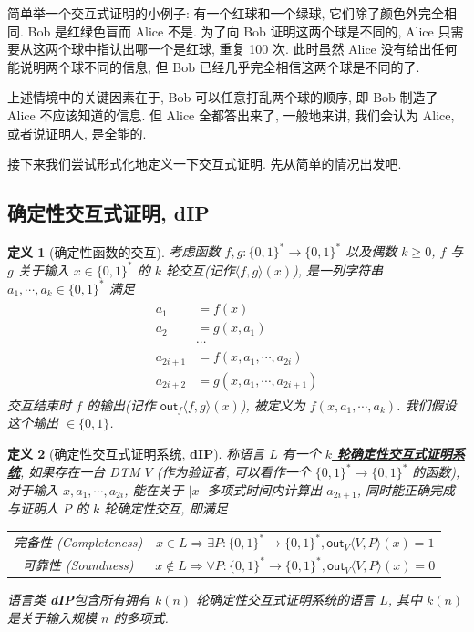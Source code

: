 \documentclass[8pt]{article}
\theoremstyle{compact}
\newtheorem{definition}{定义}[section]
\def\obj#1{\textbf{\uline{#1}}}
\def\ge{\geqslant}
\begin{document}
简单举一个交互式证明的小例子: 有一个红球和一个绿球, 它们除了颜色外完全相同. Bob 是红绿色盲而 Alice 不是. 为了向 Bob 证明这两个球是不同的, Alice 只需要从这两个球中指认出哪一个是红球, 重复 100 次. 此时虽然 Alice 没有给出任何能说明两个球不同的信息, 但 Bob 已经几乎完全相信这两个球是不同的了.

上述情境中的关键因素在于, Bob 可以任意打乱两个球的顺序, 即 Bob 制造了 Alice 不应该知道的信息. 但 Alice 全都答出来了, 一般地来讲, 我们会认为 Alice, 或者说证明人, 是全能的.

接下来我们尝试形式化地定义一下交互式证明. 先从简单的情况出发吧.

\def\dIP{\textbf{dIP}}
\subsection{确定性交互式证明, \dIP}
\begin{definition}[确定性函数的交互]
	考虑函数 $f, g: \{0, 1\}^* \to \{0, 1\}^*$ 以及偶数 $k \ge 0$, $f$ 与 $g$ 关于输入 $x \in \{0, 1\}^*$ 的 $k$ 轮交互(记作$\langle f, g\rangle(x)$), 是一列字符串 $a_1, \cdots, a_k \in \{0, 1\}^*$ 满足 \begin{align*}
		\begin{split}
			a_1 &= f(x) \\
			a_2 &= g(x, a_1) \\ 
			&\cdots \\
			a_{2i+1} &= f(x, a_1, \cdots, a_{2i}) \\
			a_{2i+2} &= g(x, a_1, \cdots, a_{2i+1})			
		\end{split}
	\end{align*}
	交互结束时 $f$ 的输出(记作 $\textsf{out}_f\langle f, g \rangle (x)$), 被定义为 $f(x, a_1, \cdots, a_k)$. 我们假设这个输出 $\in \{0, 1\}$.
	\label{deterministic_interaction}
\end{definition}
\begin{definition}[确定性交互式证明系统, \dIP]
	称语言 $L$ 有一个 \obj{$k$ 轮确定性交互式证明系统}, 如果存在一台 DTM $V$ (作为验证者, 可以看作一个 $\{0, 1\}^* \to \{0, 1\}^*$ 的函数), 对于输入 $x, a_1, \cdots, a_{2i}$, 能在关于 $|x|$ 多项式时间内计算出 $a_{2i+1}$, 同时能正确完成与证明人 $P$ 的 $k$ 轮确定性交互, 即满足 \begin{center}
		\begin{tabular}{cc}
			完备性 (Completeness) & $x \in L \Rightarrow \exists P: \{0, 1\}^* \to \{0, 1\}^*, \textsf{out}_V\langle V, P\rangle(x) = 1$ \\
			可靠性 (Soundness) & $x \notin L \Rightarrow \forall P: \{0, 1\}^* \to \{0, 1\}^*, \textsf{out}_V\langle V, P\rangle(x) = 0$ \\
		\end{tabular}
	\end{center}
	语言类 \dIP 包含所有拥有 $k(n)$ 轮确定性交互式证明系统的语言 $L$, 其中 $k(n)$ 是关于输入规模 $n$ 的多项式.
\end{definition}
\end{document}
